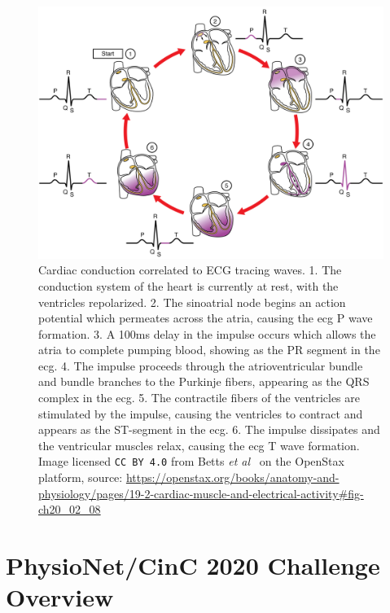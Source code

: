 \documentclass[\main/thesis.tex]{subfiles}
\begin{document}
\begin{figure}[hb]
    \centering
    \includegraphics[width=14cm]{figure/pqrst_with_heart_conduction_system.jpeg}
    \caption[Cardiac conduction correlated to ECG tracing waves.]{Cardiac conduction correlated to ECG tracing waves.
    1. The conduction system of the heart is currently at rest, with the ventricles repolarized.
    2. The sinoatrial node begins an action potential which permeates across the atria, causing the \gls{ecg} P wave formation.
    3. A 100ms delay in the impulse occurs which allows the atria to complete pumping blood, showing as the PR segment in the \gls{ecg}.
    4. The impulse proceeds through the atrioventricular bundle and bundle branches to the Purkinje fibers, appearing as the QRS complex in the \gls{ecg}.
    5. The contractile fibers of the ventricles are stimulated by the impulse, causing the ventricles to contract and appears as the ST-segment in the \gls{ecg}.
    6. The impulse dissipates and the ventricular muscles relax, causing the \gls{ecg} T wave formation.
    Image licensed \texttt{CC BY 4.0} from Betts \emph{et al}~\cite{betts-anatomy-and-physiology} on the OpenStax platform, source: \url{https://openstax.org/books/anatomy-and-physiology/pages/19-2-cardiac-muscle-and-electrical-activity\#fig-ch20_02_08}}
    \label{fig:pqrst_heart_conduction_system}
\end{figure}

\section{PhysioNet/CinC 2020 Challenge Overview}
\end{document}
